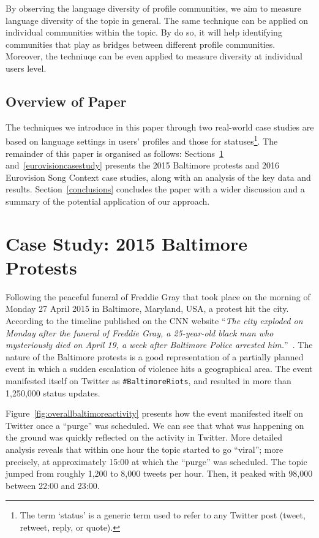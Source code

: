 By observing the language diversity of profile communities, we aim to
measure language diversity of the topic in general. The same technique
can be applied on individual communities within the topic. By do so, it will
help identifying communities that play as bridges between different
profile communities. Moreover, the techniuqe can be even
applied to measure diversity at individual users level.

\subsection{Overview of Paper}

The techniques we introduce in this paper through two real-world case
studies are based on language settings in users' profiles and those
for statuses\footnote{The term `status' is a generic term used to
refer to any Twitter post (tweet, retweet, reply, or quote).}. The
remainder of this paper is organised as follows:
Sections~\ref{baltimorecasestudy} and~\ref{eurovisioncasestudy}
presents the 2015 Baltimore protests and 2016 Eurovision Song Context
case studies, along with an analysis of the key data and
results. Section~\ref{conclusions} concludes the paper with a wider
discussion and a summary of the potential application of our approach.


\section{Case Study: 2015 Baltimore Protests}\label{baltimorecasestudy}

Following the peaceful funeral of Freddie Gray that took place on the
morning of Monday 27 April 2015 in Baltimore, Maryland, USA, a protest
hit the city. According to the timeline published on the CNN website
``{\emph{The city exploded on Monday after the funeral of Freddie
Gray, a 25-year-old black man who mysteriously died on April 19, a
week after Baltimore Police arrested
him.}}''~\cite{baltimorewiki:2015}. The nature of the Baltimore protests
is a good representation of a partially planned event in which a sudden
escalation of violence hits a geographical area. The event manifested
itself on Twitter as {\texttt{\#BaltimoreRiots}}, and resulted in more
than 1,250,000 status updates.

Figure~\ref{fig:overallbaltimoreactivity} presents how the event manifested 
itself on Twitter once a ``purge'' was scheduled. We can see that what was 
happening on the ground was quickly reflected on the activity in Twitter. More detailed 
analysis reveals that within one hour the topic started to go ``viral''; more
precisely, at approximately 15:00 at which the ``purge'' was
scheduled. The topic jumped from roughly 1,200 to 8,000 tweets per
hour. Then, it peaked with 98,000 between 22:00 and 23:00.


